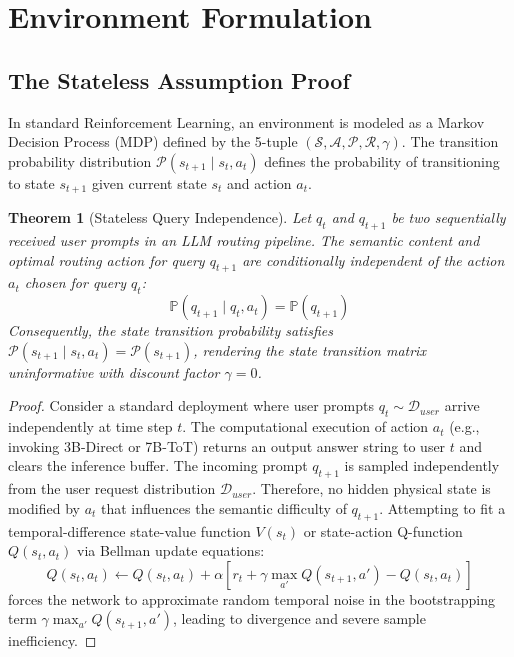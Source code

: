 \documentclass{article}
\newtheorem{theorem}{Theorem}
\begin{document}
\section{Environment Formulation}
\label{sec:formulation}

\subsection{The Stateless Assumption Proof}
In standard Reinforcement Learning, an environment is modeled as a Markov Decision Process (MDP) defined by the 5-tuple $(\mathcal{S}, \mathcal{A}, \mathcal{P}, \mathcal{R}, \gamma)$. The transition probability distribution $\mathcal{P}(s_{t+1} \mid s_t, a_t)$ defines the probability of transitioning to state $s_{t+1}$ given current state $s_t$ and action $a_t$.

\begin{theorem}[Stateless Query Independence]
Let $q_t$ and $q_{t+1}$ be two sequentially received user prompts in an LLM routing pipeline. The semantic content and optimal routing action for query $q_{t+1}$ are conditionally independent of the action $a_t$ chosen for query $q_t$:
\begin{equation}
    \mathbb{P}(q_{t+1} \mid q_t, a_t) = \mathbb{P}(q_{t+1})
\end{equation}
Consequently, the state transition probability satisfies $\mathcal{P}(s_{t+1} \mid s_t, a_t) = \mathcal{P}(s_{t+1})$, rendering the state transition matrix uninformative with discount factor $\gamma = 0$.
\end{theorem}

\begin{proof}
Consider a standard deployment where user prompts $q_t \sim \mathcal{D}_{user}$ arrive independently at time step $t$. The computational execution of action $a_t$ (e.g., invoking 3B-Direct or 7B-ToT) returns an output answer string to user $t$ and clears the inference buffer. The incoming prompt $q_{t+1}$ is sampled independently from the user request distribution $\mathcal{D}_{user}$. Therefore, no hidden physical state is modified by $a_t$ that influences the semantic difficulty of $q_{t+1}$. Attempting to fit a temporal-difference state-value function $V(s_t)$ or state-action Q-function $Q(s_t, a_t)$ via Bellman update equations:
\begin{equation}
    Q(s_t, a_t) \leftarrow Q(s_t, a_t) + \alpha \left[ r_t + \gamma \max_{a'} Q(s_{t+1}, a') - Q(s_t, a_t) \right]
\end{equation}
forces the network to approximate random temporal noise in the bootstrapping term $\gamma \max_{a'} Q(s_{t+1}, a')$, leading to divergence and severe sample inefficiency.
\end{proof}
\end{document}
